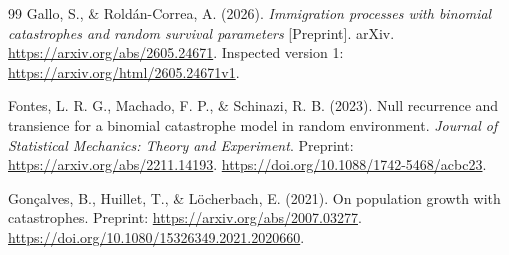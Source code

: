 \documentclass[11pt,a4paper]{article}
\theoremstyle{remark}\newtheorem{remark}[theorem]{Remark}
\begin{document}
\begin{thebibliography}{99}
Gallo, S., \& Rold\'an-Correa, A. (2026).
\emph{Immigration processes with binomial catastrophes and random survival parameters} [Preprint]. arXiv.
\url{https://arxiv.org/abs/2605.24671}.
Inspected version 1: \url{https://arxiv.org/html/2605.24671v1}.

Fontes, L. R. G., Machado, F. P., \& Schinazi, R. B. (2023).
Null recurrence and transience for a binomial catastrophe model in random environment.
\emph{Journal of Statistical Mechanics: Theory and Experiment}.
Preprint: \url{https://arxiv.org/abs/2211.14193}.
\url{https://doi.org/10.1088/1742-5468/acbc23}.

Gon\c{c}alves, B., Huillet, T., \& L\"ocherbach, E. (2021).
On population growth with catastrophes.
Preprint: \url{https://arxiv.org/abs/2007.03277}.
\url{https://doi.org/10.1080/15326349.2021.2020660}.
\end{thebibliography}
\end{document}
